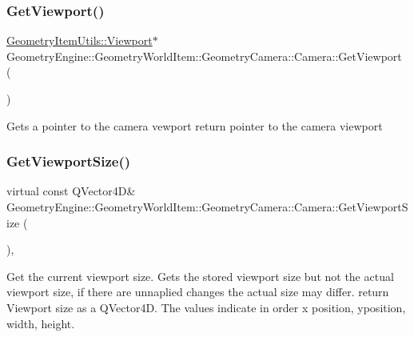 \subsubsection{\texorpdfstring{GetViewport()}{GetViewport()}}
{\footnotesize\ttfamily \mbox{\hyperlink{class_geometry_engine_1_1_geometry_item_utils_1_1_viewport}{Geometry\+Item\+Utils\+::\+Viewport}}$\ast$ Geometry\+Engine\+::\+Geometry\+World\+Item\+::\+Geometry\+Camera\+::\+Camera\+::\+Get\+Viewport (\begin{DoxyParamCaption}{ }\end{DoxyParamCaption})\hspace{0.3cm}{\ttfamily [inline]}}

Gets a pointer to the camera vewport return pointer to the camera viewport \mbox{\label{class_geometry_engine_1_1_geometry_world_item_1_1_geometry_camera_1_1_camera_a350c2e6563b78871f43fc0100cb8d1a9}} 
\subsubsection{\texorpdfstring{GetViewportSize()}{GetViewportSize()}}
{\footnotesize\ttfamily virtual const Q\+Vector4D\& Geometry\+Engine\+::\+Geometry\+World\+Item\+::\+Geometry\+Camera\+::\+Camera\+::\+Get\+Viewport\+Size (\begin{DoxyParamCaption}{ }\end{DoxyParamCaption})\hspace{0.3cm}{\ttfamily [inline]}, {\ttfamily [virtual]}}

Get the current viewport size. Gets the stored viewport size but not the actual viewport size, if there are unnaplied changes the actual size may differ. return Viewport size as a Q\+Vector4D. The values indicate in order x position, yposition, width, height. \mbox{\label{class_geometry_engine_1_1_geometry_world_item_1_1_geometry_camera_1_1_camera_a0d7981b39154b1b781af8721539659ac}} 
